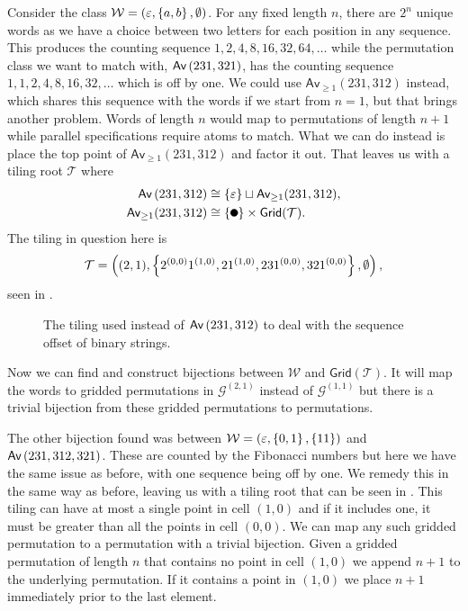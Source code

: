 Consider the class $\mathcal{W} = (\varepsilon, \left\{a,b\right\}, \emptyset)$. For any fixed length $n$, there are $2^n$ unique words as we have a choice between two letters for each position in any sequence. This produces the counting sequence $1, 2, 4, 8, 16, 32, 64, \dotsc$ while the permutation class we want to match with, $\textsf{Av}\left(231,321\right)$, has the counting sequence $1, 1, 2, 4, 8, 16, 32, \dotsc$ which is off by one. We could use $\textsf{Av}_{\geq1}(231,312)$ instead, which shares this sequence with the words if we start from $n=1$, but that brings another problem. Words of length $n$ would map to permutations of length $n+1$ while parallel specifications require atoms to match. What we can do instead is place the top point of $\textsf{Av}_{\geq1}(231,312)$ and factor it out. That leaves us with a tiling root $\mathcal{T}$ where
\begin{align*}
    \Av{231,312} &\cong \set{\varepsilon} \sqcup \textsf{Av}_{\geq1}(231,312),\\
    \textsf{Av}_{\geq1}(231,312) &\cong \set{\point{0.1}}\times \textsf{Grid}(\mathcal{T}).
\end{align*}
The tiling in question here is
\[
    \mathcal{T} = \left((2,1), \left\{2^{(0,0)}1^{(1,0)}, 21^{(1,0)}, 231^{(0,0)}, 321^{(0,0)}\right\},\emptyset\right),
\]
seen in .
\begin{figure}[ht!]
    \centering
    
    \caption{The tiling used instead of $\textsf{Av}\left(231,312\right)$ to deal with the sequence offset of binary strings.}
    \label{fig:wordtiling}
\end{figure}
Now we can find and construct bijections between $\mathcal{W}$ and $\textsf{Grid}(\mathcal{T})$. It will map the words to gridded permutations in $\mathcal{G}^{(2,1)}$ instead of $\mathcal{G}^{(1,1)}$ but there is a trivial bijection from these gridded permutations to permutations.

The other bijection found was between $\mathcal{W} = (\varepsilon, \left\{0,1\right\}, \left\{11\right\})$ and $\textsf{Av}\left(231,312,321\right)$. These are counted by the Fibonacci numbers but here we have the same issue as before, with one sequence being off by one. We remedy this in the same way as before, leaving us with a tiling root that can be seen in . This tiling can have at most a single point in cell $(1,0)$ and if it includes one, it must be greater than all the points in cell $(0,0)$. We can map any such gridded permutation to a permutation with a trivial bijection. Given a gridded permutation of length $n$ that contains no point in cell $(1,0)$ we append $n+1$ to the underlying permutation. If it contains a point in $(1,0)$ we place $n+1$ immediately prior to the last element.

